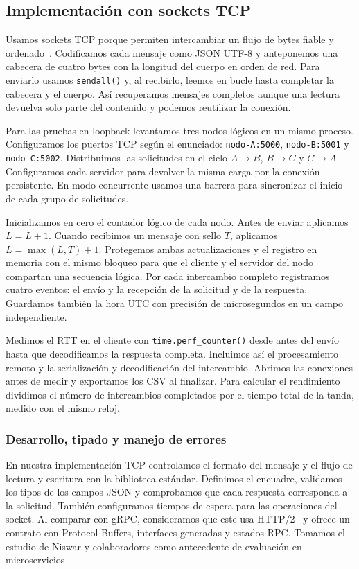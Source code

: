 \subsection{Implementación con sockets TCP}
\label{sec:sockets-tcp}

Usamos sockets TCP porque permiten intercambiar un flujo de bytes fiable y ordenado~\cite{eddy2022tcp}. Codificamos cada mensaje como JSON UTF-8 y anteponemos una cabecera de cuatro bytes con la longitud del cuerpo en orden de red. Para enviarlo usamos \texttt{sendall()} y, al recibirlo, leemos en bucle hasta completar la cabecera y el cuerpo. Así recuperamos mensajes completos aunque una lectura devuelva solo parte del contenido y podemos reutilizar la conexión.

Para las pruebas en loopback levantamos tres nodos lógicos en un mismo proceso. Configuramos los puertos TCP según el enunciado: \texttt{nodo-A:5000}, \texttt{nodo-B:5001} y \texttt{nodo-C:5002}. Distribuimos las solicitudes en el ciclo $A\to B$, $B\to C$ y $C\to A$. Configuramos cada servidor para devolver la misma carga por la conexión persistente. En modo concurrente usamos una barrera para sincronizar el inicio de cada grupo de solicitudes.

Inicializamos en cero el contador lógico de cada nodo. Antes de enviar aplicamos $L = L + 1$. Cuando recibimos un mensaje con sello $T$, aplicamos $L = \max(L,T) + 1$. Protegemos ambas actualizaciones y el registro en memoria con el mismo bloqueo para que el cliente y el servidor del nodo compartan una secuencia lógica. Por cada intercambio completo registramos cuatro eventos: el envío y la recepción de la solicitud y de la respuesta. Guardamos también la hora UTC con precisión de microsegundos en un campo independiente.

Medimos el RTT en el cliente con \texttt{time.perf\_counter()} desde antes del envío hasta que decodificamos la respuesta completa. Incluimos así el procesamiento remoto y la serialización y decodificación del intercambio. Abrimos las conexiones antes de medir y exportamos los CSV al finalizar. Para calcular el rendimiento dividimos el número de intercambios completados por el tiempo total de la tanda, medido con el mismo reloj.

\subsubsection{Desarrollo, tipado y manejo de errores}

En nuestra implementación TCP controlamos el formato del mensaje y el flujo de lectura y escritura con la biblioteca estándar. Definimos el encuadre, validamos los tipos de los campos JSON y comprobamos que cada respuesta corresponda a la solicitud. También configuramos tiempos de espera para las operaciones del socket. Al comparar con gRPC, consideramos que este usa HTTP/2~\cite{thomson2022http2} y ofrece un contrato con Protocol Buffers, interfaces generadas y estados RPC. Tomamos el estudio de Niswar y colaboradores como antecedente de evaluación en microservicios~\cite{niswar2024microservices}.
